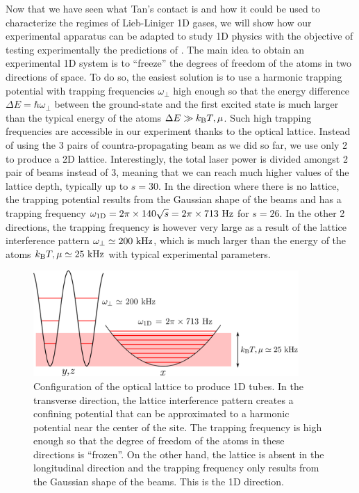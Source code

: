 Now that we have seen what Tan's contact is and how it could be used to characterize the regimes of Lieb-Liniger 1D gases, we will show how our experimental apparatus can be adapted to study 1D physics with the objective of testing experimentally the predictions of \cite{yao2018tan}. The main idea to obtain an  experimental 1D system is to ``freeze'' the degrees of freedom of the atoms in two directions of space. To do so, the easiest solution is to use a harmonic trapping potential with trapping frequencies $\omega_{\perp}$ high enough so that the energy difference $\Delta E =\hbar \omega_{\perp}$ between the ground-state and the first excited state is much larger than the typical energy of the atoms $\Delta E \gg k_{\mathrm{B}} T, \mu$. Such high trapping frequencies are accessible in our experiment thanks to the optical lattice. Instead of using the 3 pairs of countra-propagating beam as we did so far, we use only 2 to produce a 2D lattice. Interestingly, the total laser power is divided amongst 2 pair of beams instead of 3, meaning that we can reach much higher values of the lattice depth, typically up to $s=30$. In the direction where there is no lattice, the trapping potential results from the Gaussian shape of the beams and has a trapping frequency $\omega_{\rm{1D}} =2 \pi \times 140 \sqrt{s} = 2 \pi  \times 713 \ \rm{Hz}$ for $s=26$. In the other 2 directions, the trapping frequency is however very large as a result of the lattice interference pattern $\omega_{\perp} \simeq 200 \ \rm{kHz}$, which is much larger than the energy of the atoms $k_{\mathrm{B}} T, \mu \simeq 25 \ \rm{kHz}$ with typical experimental parameters.

\begin{figure}
    \centering
    \includegraphics[width=0.9\textwidth]{Fig/Chapter5/1D_config.png}
    \caption{Configuration of the optical lattice to produce 1D tubes. In the transverse direction, the lattice interference pattern creates a confining potential that can be approximated to a harmonic potential near the center of the site. The trapping frequency is high enough so that the degree of freedom of the atoms in these directions is ``frozen''. On the other hand, the lattice is absent in the longitudinal direction and the trapping frequency only results from the Gaussian shape of the beams. This is the 1D direction.}
    \label{fig:my_label}
\end{figure}


